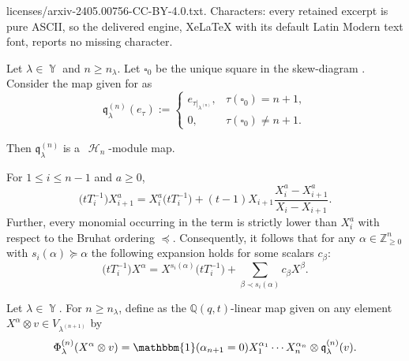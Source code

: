 \documentclass[10pt,a4paper]{amsart}
\DeclareMathOperator{\Par}{\mathbb{Y}}
\DeclareMathOperator{\SYT}{\mathrm{SYT}}
\DeclareMathOperator{\sH}{\mathscr{H}}
\begin{document}
licenses/arxiv-2405.00756-CC-BY-4.0.txt. Characters: every retained excerpt is pure ASCII, so the delivered engine, XeLaTeX with its default Latin Modern text font, reports no missing character.
\begin{Lemma}\label{finite hecke map}
 Let $\lambda \in \Par$ and $n \geq n_{\lambda}$. Let $\square_0$ be the unique square in the skew-diagram . Consider the map  given for \smash{$\tau \in \SYT\bigl(\lambda^{(n+1)}\bigr)$} as
 \[
 \mathfrak{q}_{\lambda}^{(n)}(e_{\tau}) := \begin{cases}
 e_{\tau|_{\lambda^{(n)}}}, & \tau(\square_0) = n+1,\\
 0, & \tau(\square_0) \neq n+1.
 \end{cases}
 \]

 Then $\mathfrak{q}_{\lambda}^{(n)}$ is a~$\sH_{n}$-module map.
\end{Lemma}

\begin{Lemma}\label{action of T inverse}
 For $1\leq i \leq n-1$ and $a \geq 0$,
 \[
 \bigl(tT_i^{-1}\bigr)X_{i+1}^{a} = X_i^{a}\bigl(tT_i^{-1}\bigr) + (t-1)X_{i+1}\frac{X_i^{a}-X_{i+1}^{a}}{X_i-X_{i+1}}.
 \]
 Further, every monomial occurring in the term  is strictly lower than $X_i^{a}$ with respect to the Bruhat ordering $\preceq$. Consequently, it follows that for any $\alpha \in \mathbb{Z}^n_{\geq 0}$ with $s_i(\alpha) \succeq \alpha$ the following expansion holds for some scalars $c_{\beta}$:
 \[
 \bigl(tT_i^{-1}\bigr)X^{\alpha} = X^{s_i(\alpha)}\bigl(tT_i^{-1}\bigr) + \sum_{\beta \prec s_i(\alpha)} c_{\beta}X^{\beta}.
 \]
\end{Lemma}

\begin{Definition}\label{connecting maps def}
 Let $\lambda \in \Par$. For $n \geq n_{\lambda}$, define  as the $\mathbb{Q}(q,t)$-linear map given on any element $X^{\alpha}\otimes v \in V_{\lambda^{(n+1)}}$ by
 \[
 \Phi^{(n)}_{\lambda}(X^{\alpha}\otimes v) = \mathbbm{1}(\alpha_{n+1} = 0) X_1^{\alpha_1}\cdots X_n^{\alpha_n}\otimes \mathfrak{q}^{(n)}_{\lambda}(v).
 \]

\end{Definition}
\end{document}

